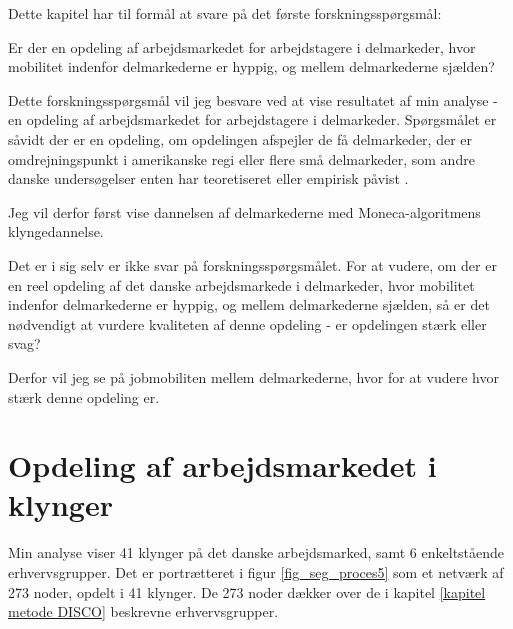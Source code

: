 Dette kapitel har til formål at svare på det første forskningsspørgsmål:

\begin{tcolorbox}[title=Forskningspørgsmål,
subtitle style={boxrule=0.4pt} ]
	 Er der en opdeling af arbejdsmarkedet for arbejdstagere i delmarkeder, hvor mobilitet indenfor delmarkederne er hyppig, og mellem delmarkederne sjælden?
\end{tcolorbox}

Dette forskningsspørgsmål vil jeg besvare ved at vise resultatet af min analyse - en opdeling af arbejdsmarkedet for arbejdstagere i delmarkeder. Spørgsmålet er såvidt der er en opdeling, om opdelingen afspejler de få delmarkeder, der er omdrejningspunkt i amerikanske regi \parencite{Piore1980, Gordon1982} eller flere små delmarkeder, som andre danske undersøgelser enten har teoretiseret eller empirisk påvist \parencite{Boje1985, Touboel2013}.

Jeg vil derfor først vise dannelsen af delmarkederne med Moneca-algoritmens klyngedannelse.

Det er i sig selv er ikke svar på forskningsspørgsmålet. For at vudere, om der er en reel opdeling af det danske arbejdsmarkede i delmarkeder, hvor mobilitet indenfor delmarkederne er hyppig, og mellem delmarkederne sjælden, så er det nødvendigt at vurdere kvaliteten af denne opdeling - er opdelingen stærk eller svag?

Derfor vil jeg se på jobmobiliten mellem delmarkederne, hvor for at vudere hvor stærk denne opdeling er. 

\section{Opdeling af arbejdsmarkedet i klynger \label{delanalyse1_endelige mobilitetskort}}

Min analyse viser 41 klynger på det danske arbejdsmarked, samt 6 enkeltstående erhvervsgrupper. Det er portrætteret i figur \ref{fig_seg_proces5} som et netværk af 273 noder, opdelt i 41 klynger. De 273 noder dækker over de i kapitel \ref{kapitel metode DISCO} beskrevne erhvervsgrupper. 



